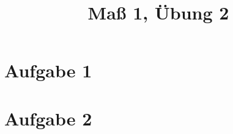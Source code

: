 \documentclass[]{article}
\author{}
\title{Maß 1, Übung 2}
\begin{document}
    \begin{titlepage}
        \maketitle
    \end{titlepage}
    
    \section{Aufgabe 1}
    
    \section{Aufgabe 2}
    

    
    
\end{document}

